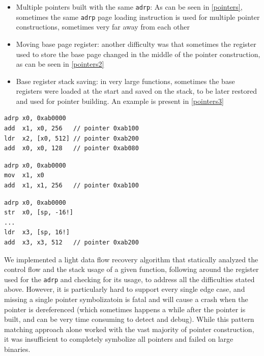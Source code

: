 \documentclass[a4paper,11pt,oneside]{report}
\begin{document}
\begin{itemize}
	\item Multiple pointers built with the same \texttt{adrp}: As can be seen 
		in \autoref{pointers}, sometimes the same \texttt{adrp} page loading 
		instruction is used for multiple pointer constructions, sometimes very 
		far away from each other
	\item Moving base page register: another difficulty was that sometimes the 
		register used to store the base page changed in the middle of the 
		pointer construction, as can be seen in \autoref{pointers2}
	\item Base register stack saving: in very large functions, sometimes the 
		base registers were loaded at the start and saved on the stack, to be 
		later restored and used for pointer building. An example is present in 
		\autoref{pointers3}
\end{itemize}

\begin{lstlisting}[float,floatplacement=H,label=pointers,caption={Example of multiple pointers built from the same \texttt{adrp} instruction}]
adrp x0, 0xab0000
add  x1, x0, 256   // pointer 0xab100
ldr  x2, [x0, 512] // pointer 0xab200
add  x0, x0, 128   // pointer 0xab080
\end{lstlisting}
\begin{lstlisting}[float,floatplacement=H,label=pointers2,caption={Example of changing register during
pointer construction}]
adrp x0, 0xab0000
mov  x1, x0
add  x1, x1, 256   // pointer 0xab100
\end{lstlisting}
\begin{lstlisting}[float,floatplacement=H,label=pointers3,caption={Example of base page register stack
saving}]
adrp x0, 0xab0000
str  x0, [sp, -16!]
...
ldr  x3, [sp, 16!]
add  x3, x3, 512   // pointer 0xab200
\end{lstlisting}


We implemented a light data flow recovery algorithm
that statically analyzed the control flow and the stack usage of a given
function, following around the register used for the \texttt{adrp} and checking
for its usage, to address all the difficulties stated above. However, it is
particularly hard to support every single edge case, and missing a single
pointer symbolizatoin is fatal and will cause a crash when the pointer is 
dereferenced (which sometimes happens a while after the pointer is built, 
and can be very time consuming to detect and debug). 
While this pattern matching approach alone worked with the vast majority of
pointer construction, it was insufficient to completely symbolize all pointers
and failed on large binaries. 
\end{document}
